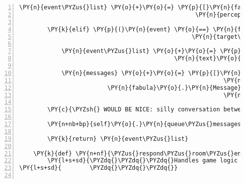 \begin{Verbatim}[commandchars=\\\{\},numbers=left,firstnumber=1,stepnumber=1]
            \PY{n}{event\PYZus{}list} \PY{o}{+}\PY{o}{=} \PY{p}{[}\PY{n}{fabula}\PY{o}{.}\PY{n}{PerceptionEvent}\PY{p}{(}\PY{n}{identifier}\PY{o}{=}\PY{n}{ID\PYZus{}KUNI}\PY{p}{,}
                                                  \PY{n}{perception}\PY{o}{=}\PY{l+s}{\PYZsq{}}\PY{l+s}{Hier geht es zurück auf den Gnomenweg.}\PY{l+s}{\PYZsq{}}\PY{p}{)}\PY{p}{]}

        \PY{k}{elif} \PY{p}{(}\PY{n}{event} \PY{o}{==} \PY{n}{fabula}\PY{o}{.}\PY{n}{TriesToTalkToEvent}\PY{p}{(}\PY{n}{identifier}\PY{o}{=}\PY{n}{ID\PYZus{}KUNI}\PY{p}{,}
                                                 \PY{n}{target\PYZus{}identifier}\PY{o}{=}\PY{l+s}{\PYZsq{}}\PY{l+s}{elf}\PY{l+s}{\PYZsq{}}\PY{p}{)}\PY{p}{)}\PY{p}{:}

            \PY{n}{event\PYZus{}list} \PY{o}{+}\PY{o}{=} \PY{p}{[}\PY{n}{fabula}\PY{o}{.}\PY{n}{SaysEvent}\PY{p}{(}\PY{n}{identifier}\PY{o}{=}\PY{n}{ID\PYZus{}KUNI}\PY{p}{,}
                                            \PY{n}{text}\PY{o}{=}\PY{l+s}{\PYZsq{}}\PY{l+s}{ Was machst du hier?}\PY{l+s}{\PYZsq{}}\PY{p}{)}\PY{p}{]}

            \PY{n}{messages} \PY{o}{+}\PY{o}{=} \PY{p}{[}\PY{n}{fabula}\PY{o}{.}\PY{n}{Message}\PY{p}{(}\PY{p}{[}\PY{n}{fabula}\PY{o}{.}\PY{n}{SaysEvent}\PY{p}{(}\PY{n}{identifier}\PY{o}{=}\PY{l+s}{\PYZsq{}}\PY{l+s}{elf}\PY{l+s}{\PYZsq{}}\PY{p}{,}
                                                          \PY{n}{text}\PY{o}{=}\PY{l+s}{\PYZsq{}}\PY{l+s}{Ich hab Harfe\PYZhy{}Spielen\PYZhy{}Schicht und das noch fünf Stunden lang.}\PY{l+s}{\PYZsq{}}\PY{p}{)}\PY{p}{]}\PY{p}{)}\PY{p}{,}
                         \PY{n}{fabula}\PY{o}{.}\PY{n}{Message}\PY{p}{(}\PY{p}{[}\PY{n}{fabula}\PY{o}{.}\PY{n}{SaysEvent}\PY{p}{(}\PY{n}{identifier}\PY{o}{=}\PY{l+s}{\PYZsq{}}\PY{l+s}{elf}\PY{l+s}{\PYZsq{}}\PY{p}{,}
                                                          \PY{n}{text}\PY{o}{=}\PY{l+s}{\PYZsq{}}\PY{l+s}{Dabei bin ich sooo durstig!}\PY{l+s}{\PYZsq{}}\PY{p}{)}\PY{p}{]}\PY{p}{)}\PY{p}{]}

        \PY{c}{\PYZsh{} WOULD BE NICE: silly conversation between Kuni and elf}

        \PY{n+nb+bp}{self}\PY{o}{.}\PY{n}{queue\PYZus{}messages}\PY{p}{(}\PY{o}{*}\PY{n}{messages}\PY{p}{)}

        \PY{k}{return} \PY{n}{event\PYZus{}list}

    \PY{k}{def} \PY{n+nf}{\PYZus{}respond\PYZus{}room\PYZus{}entry}\PY{p}{(}\PY{n+nb+bp}{self}\PY{p}{,} \PY{n}{event}\PY{p}{,} \PY{n}{room}\PY{p}{)}\PY{p}{:}
        \PY{l+s+sd}{\PYZdq{}\PYZdq{}\PYZdq{}Handles game logic for room entry.}
\PY{l+s+sd}{        \PYZdq{}\PYZdq{}\PYZdq{}}


\end{Verbatim}
